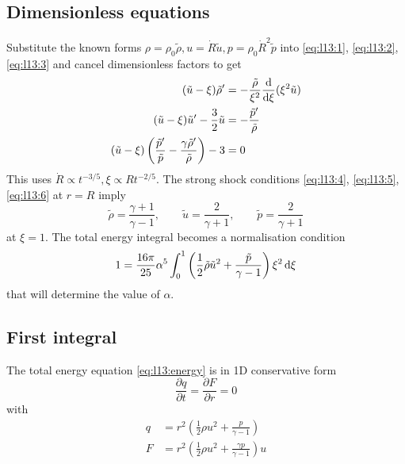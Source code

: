 \documentclass{jknotes}
\begin{document}
\subsection{Dimensionless equations}
Substitute the known forms $\rho = \rho_0 \tilde{\rho}, u = \dot{R} \tilde{u},
p = \rho_0 \dot{R}^2 \tilde{p}$ into \eqref{eq:l13:1}, \eqref{eq:l13:2},
\eqref{eq:l13:3} and cancel dimensionless factors to get
\begin{align}
	(\tilde{u}-\xi) \tilde{\rho}' &= - \frac{\tilde{\rho}}{\xi^2}
	\frac{\diffd}{\diffd \xi}(\xi^2 \tilde{u}) \label{eq:l13:7}\\
	(\tilde{u}-\xi)\tilde{u}' - \frac{3}{2}\tilde{u} &=
	-\frac{\tilde{p}'}{\tilde{\rho}} \label{eq:l13:8}\\
	(\tilde{u}-\xi)\left(\frac{\tilde{p}'}{\tilde{p}} - \frac{\gamma
\tilde{\rho}'}{\tilde{\rho}}\right) -3 &= 0\label{eq:l13:9}
\end{align}
This uses $\dot{R} \propto t^{-3/5}, \xi \propto R t^{-2/5}$. The strong shock
conditions \eqref{eq:l13:4}, \eqref{eq:l13:5}, \eqref{eq:l13:6} at $r=R$ imply
\begin{equation}
	\tilde{\rho} = \frac{\gamma+1}{\gamma-1}, \hspace{2em} \tilde{u} =
	\frac{2}{\gamma +1}, \hspace{2em} \tilde{p} = \frac{2}{\gamma +1}
	\label{eq:l13:BCs}
\end{equation}
at $\xi = 1$. The total energy integral becomes a normalisation condition
\begin{equation}
	1 = \frac{16 \pi}{25} \alpha^5 \int_0^1 \left(
	\frac{1}{2}\tilde{\rho}\tilde{u}^2 + \frac{\tilde{p}}{\gamma -1}\right)
	\xi^2\, \diffd \xi
\end{equation}
that will determine the value of $\alpha$.

\subsection{First integral}
The total energy equation \eqref{eq:l13:energy} is in 1D conservative form 
\begin{equation}
	\frac{\partial q}{\partial t} = \frac{\partial F}{\partial r} = 0
	\label{eq:l14:1}
\end{equation}
with
\begin{align}
	q &= r^2 \left( \frac{1}{2} \rho u^2 + \frac{p}{\gamma -1}\right) \\
	F &= r^2 \left( \frac{1}{2} \rho u^2 + \frac{\gamma p}{\gamma -1} \right)
	u
\end{align}
\end{document}
